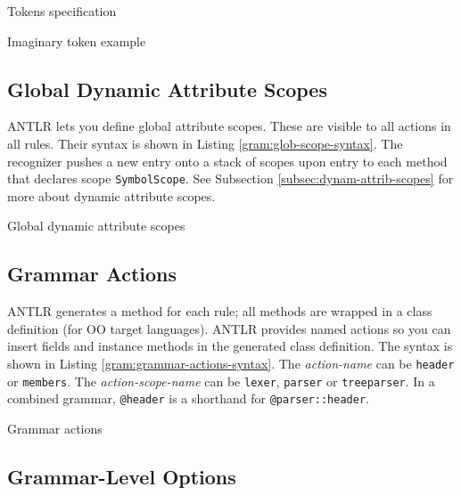 \begin{program}
\caption{Tokens specification\label{gram:tokens-specification}}
\end{program}

\begin{program}
\caption{Imaginary token example\label{gram:tokens-simple}}
\end{program}


\subsection{Global Dynamic Attribute Scopes}

ANTLR lets you define global attribute scopes.
These are visible to all actions in all rules.
Their syntax is shown in Listing \ref{gram:glob-scope-syntax}.
The recognizer pushes a new entry onto a stack of scopes
upon entry to each method that declares scope \verb=SymbolScope=.
See Subsection \ref{subsec:dynam-attrib-scopes}
for more about dynamic attribute scopes.

\begin{program}
\caption{Global dynamic attribute scopes\label{gram:glob-scope-syntax}}
\end{program}


\subsection{Grammar Actions}

ANTLR generates a method for each rule;
all methods are wrapped in a class definition (for OO target languages).
ANTLR provides named actions so you can insert fields and instance methods
in the generated class definition.
The syntax is shown in Listing \ref{gram:grammar-actions-syntax}.
The \emph{action-name} can be \verb=header= or \verb=members=.
The \emph{action-scope-name} can be
\verb=lexer=, \verb=parser= or \verb=treeparser=.
In a combined grammar,
\verb=@header= is a shorthand for \verb=@parser::header=.

\begin{program}
\caption{Grammar actions\label{gram:grammar-actions-syntax}}
\end{program}


\subsection{Grammar-Level Options}

